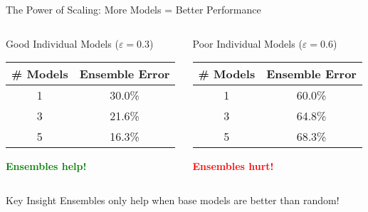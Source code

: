 \documentclass[10pt]{beamer}
\begin{document}
\begin{frame}{The Power of Scaling: More Models = Better Performance}
\begin{columns}
\begin{column}{0.5\textwidth}
\begin{examplebox}{Good Individual Models ($\varepsilon = 0.3$)}
\begin{center}
\begin{tabular}{c|c}
\# Models & Ensemble Error \\
\hline
1 & 30.0\% \\
3 & 21.6\% \\
5 & 16.3\% \\
\end{tabular}
\end{center}

\textcolor{green}{\textbf{Ensembles help!}}
\end{examplebox}
\end{column}

\begin{column}{0.5\textwidth}
\begin{alertbox}{Poor Individual Models ($\varepsilon = 0.6$)}
\begin{center}
\begin{tabular}{c|c}
\# Models & Ensemble Error \\
\hline
1 & 60.0\% \\
3 & 64.8\% \\
5 & 68.3\% \\
\end{tabular}
\end{center}

\textcolor{red}{\textbf{Ensembles hurt!}}
\end{alertbox}
\end{column}
\end{columns}

\begin{keypointsbox}{Key Insight}
Ensembles only help when base models are better than random!
\end{keypointsbox}
\end{frame}

\vspace{-0.2cm}
\end{document}
